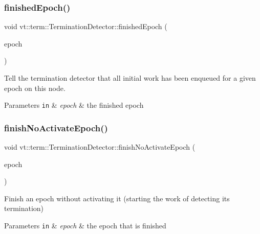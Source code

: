 \subsubsection{\texorpdfstring{finished\+Epoch()}{finishedEpoch()}}
{\footnotesize\ttfamily void vt\+::term\+::\+Termination\+Detector\+::finished\+Epoch (\begin{DoxyParamCaption}\item[{\hyperlink{namespacevt_a985a5adf291c34a3ca263b3378388236}{Epoch\+Type} const \&}]{epoch }\end{DoxyParamCaption})}



Tell the termination detector that all initial work has been enqueued for a given epoch on this node. 


\begin{DoxyParams}[1]{Parameters}
\mbox{\tt in}  & {\em epoch} & the finished epoch \\
\hline
\end{DoxyParams}
\mbox{\label{structvt_1_1term_1_1_termination_detector_a349739e9ee6dea98a863b4afb1e49c10}} 
\subsubsection{\texorpdfstring{finish\+No\+Activate\+Epoch()}{finishNoActivateEpoch()}}
{\footnotesize\ttfamily void vt\+::term\+::\+Termination\+Detector\+::finish\+No\+Activate\+Epoch (\begin{DoxyParamCaption}\item[{\hyperlink{namespacevt_a985a5adf291c34a3ca263b3378388236}{Epoch\+Type} const \&}]{epoch }\end{DoxyParamCaption})}



Finish an epoch without activating it (starting the work of detecting its termination) 


\begin{DoxyParams}[1]{Parameters}
\mbox{\tt in}  & {\em epoch} & the epoch that is finished \\
\hline
\end{DoxyParams}
\mbox{\label{structvt_1_1term_1_1_termination_detector_a3b1e4a0d87c5af08fc36925ec74504fd}} 
